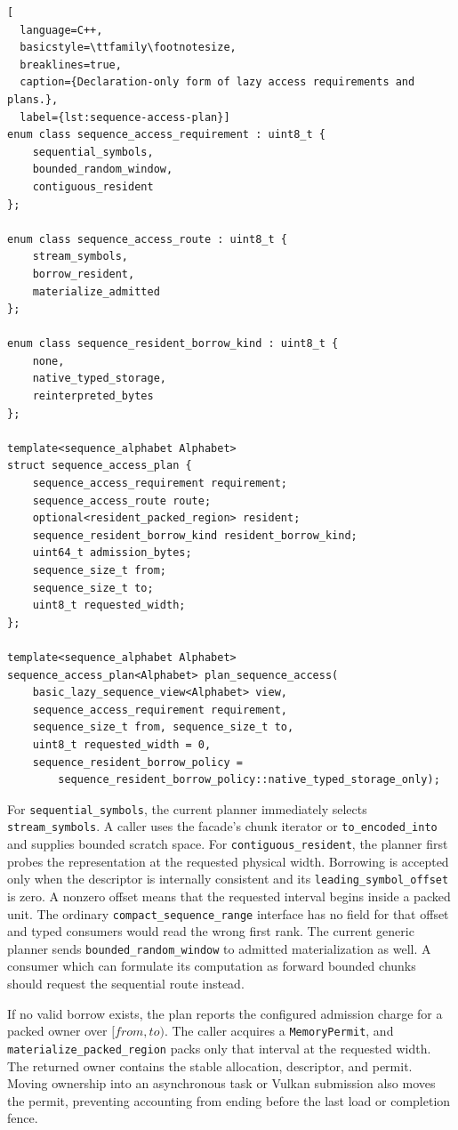 \begin{lstlisting}[
  language=C++,
  basicstyle=\ttfamily\footnotesize,
  breaklines=true,
  caption={Declaration-only form of lazy access requirements and plans.},
  label={lst:sequence-access-plan}]
enum class sequence_access_requirement : uint8_t {
    sequential_symbols,
    bounded_random_window,
    contiguous_resident
};

enum class sequence_access_route : uint8_t {
    stream_symbols,
    borrow_resident,
    materialize_admitted
};

enum class sequence_resident_borrow_kind : uint8_t {
    none,
    native_typed_storage,
    reinterpreted_bytes
};

template<sequence_alphabet Alphabet>
struct sequence_access_plan {
    sequence_access_requirement requirement;
    sequence_access_route route;
    optional<resident_packed_region> resident;
    sequence_resident_borrow_kind resident_borrow_kind;
    uint64_t admission_bytes;
    sequence_size_t from;
    sequence_size_t to;
    uint8_t requested_width;
};

template<sequence_alphabet Alphabet>
sequence_access_plan<Alphabet> plan_sequence_access(
    basic_lazy_sequence_view<Alphabet> view,
    sequence_access_requirement requirement,
    sequence_size_t from, sequence_size_t to,
    uint8_t requested_width = 0,
    sequence_resident_borrow_policy =
        sequence_resident_borrow_policy::native_typed_storage_only);
\end{lstlisting}

For \texttt{sequential\_symbols}, the current planner immediately selects
\texttt{stream\_symbols}.  A caller uses the facade's chunk iterator or
\texttt{to\_encoded\_into} and supplies bounded scratch space.  For
\texttt{contiguous\_resident}, the planner first probes the representation at
the requested physical width.  Borrowing is accepted only when the descriptor
is internally consistent and its \texttt{leading\_symbol\_offset} is zero.  A
nonzero offset means that the requested interval begins inside a packed unit.
The ordinary \texttt{compact\_sequence\_range} interface has no field for that
offset and typed consumers would read the wrong first rank.  The current
generic planner sends \texttt{bounded\_random\_window} to admitted
materialization as well.  A consumer which can formulate its computation as
forward bounded chunks should request the sequential route instead.

If no valid borrow exists, the plan reports the configured admission charge
for a packed owner over \([from,to)\).  The caller acquires a
\texttt{MemoryPermit}, and
\texttt{materialize\_packed\_region} packs only that interval at the requested
width.  The returned owner contains the stable allocation, descriptor, and
permit.  Moving ownership into an asynchronous task or Vulkan submission also
moves the permit, preventing accounting from ending before the last load or
completion fence.

